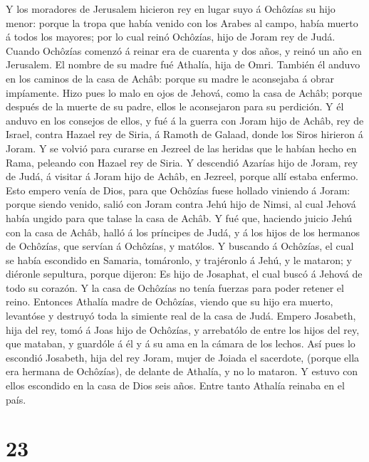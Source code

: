  Y los moradores de Jerusalem hicieron rey en lugar suyo á
Ochôzías su hijo menor: porque la tropa que había venido con los Arabes
al campo, había muerto á todos los mayores; por lo cual reinó Ochôzías,
hijo de Joram rey de Judá.  Cuando Ochôzías comenzó á reinar
era de cuarenta y dos años, y reinó un año en Jerusalem. El nombre de su
madre fué Athalía, hija de Omri.  También él anduvo en los
caminos de la casa de Achâb: porque su madre le aconsejaba á obrar
impíamente.  Hizo pues lo malo en ojos de Jehová, como la
casa de Achâb; porque después de la muerte de su padre, ellos le
aconsejaron para su perdición.  Y él anduvo en los consejos
de ellos, y fué á la guerra con Joram hijo de Achâb, rey de Israel,
contra Hazael rey de Siria, á Ramoth de Galaad, donde los Siros hirieron
á Joram.  Y se volvió para curarse en Jezreel de las heridas
que le habían hecho en Rama, peleando con Hazael rey de Siria. Y
descendió Azarías hijo de Joram, rey de Judá, á visitar á Joram hijo de
Achâb, en Jezreel, porque allí estaba enfermo.  Esto empero
venía de Dios, para que Ochôzías fuese hollado viniendo á Joram: porque
siendo venido, salió con Joram contra Jehú hijo de Nimsi, al cual Jehová
había ungido para que talase la casa de Achâb.  Y fué que,
haciendo juicio Jehú con la casa de Achâb, halló á los príncipes de
Judá, y á los hijos de los hermanos de Ochôzías, que servían á Ochôzías,
y matólos.  Y buscando á Ochôzías, el cual se había
escondido en Samaria, tomáronlo, y trajéronlo á Jehú, y le mataron; y
diéronle sepultura, porque dijeron: Es hijo de Josaphat, el cual buscó á
Jehová de todo su corazón. Y la casa de Ochôzías no tenía fuerzas para
poder retener el reino.  Entonces Athalía madre de
Ochôzías, viendo que su hijo era muerto, levantóse y destruyó toda la
simiente real de la casa de Judá.  Empero Josabeth, hija
del rey, tomó á Joas hijo de Ochôzías, y arrebatólo de entre los hijos
del rey, que mataban, y guardóle á él y á su ama en la cámara de los
lechos. Así pues lo escondió Josabeth, hija del rey Joram, mujer de
Joiada el sacerdote, (porque ella era hermana de Ochôzías), de delante
de Athalía, y no lo mataron.  Y estuvo con ellos escondido
en la casa de Dios seis años. Entre tanto Athalía reinaba en el país.

\hypertarget{section-22}{%
\section{23}\label{section-22}}

